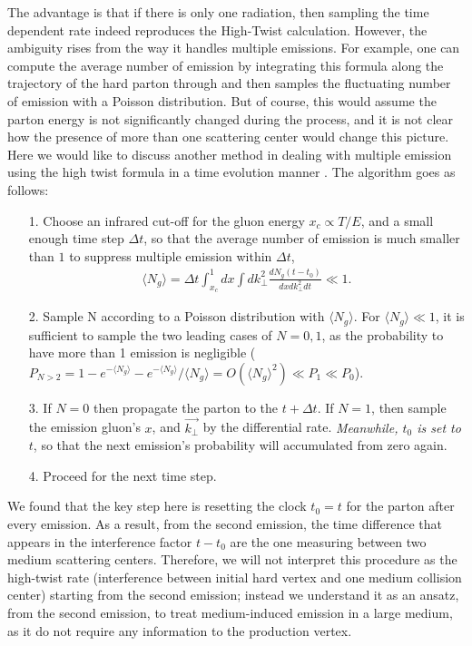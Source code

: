 The advantage is that if there is only one radiation, then sampling the time dependent rate indeed reproduces the High-Twist calculation.
However, the ambiguity rises from the way it handles multiple emissions.
For example, one can compute the average number of emission by integrating this formula along the trajectory of the hard parton through and then samples the fluctuating number of emission with a Poisson distribution.
But of course, this would assume the parton energy is not significantly changed during the process, and it is not clear how the presence of more than one scattering center would change this picture.
Here we would like to discuss another method in dealing with multiple emission using the high twist formula in a time evolution manner \cite{Cao:2013ita}.
The algorithm goes as follows:
\begin{itemize}
\item[1.] Choose an infrared cut-off for the gluon energy $x_c \propto T/E$, and a small enough time step $\Delta t$, so that the average number of emission is much smaller than $1$ to suppress multiple emission within $\Delta t$,
\begin{eqnarray}
\langle N_g \rangle = \Delta t \int_{x_c}^1 dx \int dk_\perp^2 \frac{dN_g(t-t_0)}{dx dk_\perp^2 dt} \ll 1.
\end{eqnarray}
\item[2.] Sample N according to a Poisson distribution with $\langle N_g \rangle$. For $\langle N_g \rangle \ll 1$, it is sufficient to sample the two leading cases of $N=0, 1$, as the probability to have more than 1 emission is negligible ($P_{N>2} = 1-e^{-\langle N_g \rangle}-e^{-\langle N_g \rangle}/\langle N_g \rangle = O(\langle N_g \rangle^2) \ll P_1 \ll P_0$).
\item[3.] If $N=0$ then propagate the parton to the $t+\Delta t$. If $N=1$, then sample the emission gluon's $x$, and $\vec{k_\perp}$ by the differential rate. {\it Meanwhile, $t_0$ is set to $t$}, so that the next emission's probability will accumulated from zero again.
\item[4.] Proceed for the next time step.
\end{itemize}
We found that the key step here is resetting the clock $t_0 = t$ for the parton after every emission.
As a result, from the second emission, the time difference that appears in the interference factor $t-t_0$ are the one measuring between two medium scattering centers.
Therefore, we will not interpret this procedure as the high-twist rate (interference between initial hard vertex and one medium collision center) starting from the second emission;
instead we understand it as an ansatz, from the second emission, to treat medium-induced emission in a large medium, as it do not require any information to the production vertex.

